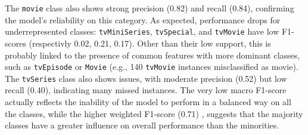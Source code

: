 The \texttt{movie} class also shows strong precision (0.82) and recall (0.84), confirming the model’s reliability on this category.
As expected, performance drops for underrepresented classes: \texttt{tvMiniSeries}, \texttt{tvSpecial}, and \texttt{tvMovie}  have low F1-scores (respectivly 0.02, 0.21, 0.17). 
Other than their low support, this is probably linked to the presence of common features with more dominant classes, such as \texttt{tvEpisode} or \texttt{Movie} (e.g., 140 \texttt{tvMovie} instances misclassified as movie). 
The \texttt{tvSeries} class also shows issues, with moderate precision (0.52) but low recall (0.40), indicating many missed instances.
The very low macro F1-score actually reflects the inability of the model to perform in a balanced way on all the classes, 
while the higher weighted F1-score (0.71) , suggests that the majority classes have a greater influence on overall performance than the minorities.




